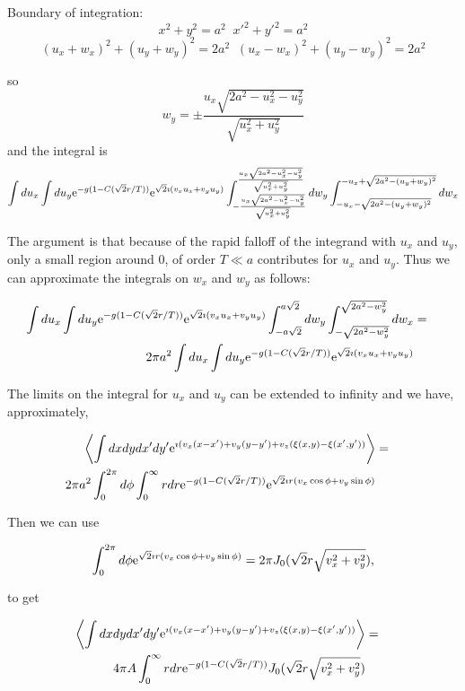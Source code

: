 \documentclass[11pt,openany]{report}
\newcommand{\e}{{\rm e}}
\begin{document}
{{Boundary of integration:
$$x^{2}+y^{2}=a^{2}\;\;x'^{2}+y'^{2}=a^{2}$$
$$(u_{x}+w_{x})^{2}+(u_{y}+w_{y})^{2}=2a^{2}\;\;(u_{x}-w_{x})^{2}+(u_{y}-w_{y})^{2}=2a^{2}$$

so
$$w_{y}=\pm\frac{u_{x}\sqrt{2a^{2}-u_{x}^{2}-u_y^{2}}}{\sqrt{u_{x}^{2}+u_{y}^{2}}}$$
and
 the integral is
$$\int du_{x} \int du_{y}\e^{-g(1-C(\sqrt{2}r/T))}\e^{\sqrt{2}\imath( v_{x}u_{x}+v_{y}u_{y})}\int_{-\frac{u_{x}\sqrt{2a^{2}-u_{x}^{2}-u_y^{2}}}{\sqrt{u_{x}^{2}+u_{y}^{2}}}}^{\frac{u_{x}\sqrt{2a^{2}-u_{x}^{2}-u_y^{2}}}{\sqrt{u_{x}^{2}+u_{y}^{2}}}} dw_{y}\int_{-u_{x}-\sqrt{2a^{2}-(u_{y}+w_{y})^{2}}}^{-u_{x}+\sqrt{2a^{2}-(u_{y}+w_{y})^{2}}}dw_{x}$$

The argument is that because of the rapid falloff of the integrand with $u_{x}$ and $u_{y}$, only a small region around 0, of order $T\ll a$ contributes for $u_{x}$ and $u_{y}$. Thus we can approximate the integrals on $w_{x}$ and $w_{y}$ as follows:

\begin{eqnarray}
\int du_{x} \int du_{y}\e^{-g(1-C(\sqrt{2}r/T))}\e^{\sqrt{2}\imath( v_{x}u_{x}+v_{y}u_{y})}\int_{-a\sqrt{2}}^{a\sqrt{2}}dw_{y}\int_{-\sqrt{2a^{2}-w_{y}^{2}}}^{\sqrt{2a^{2}-w_{y}^{2}}}dw_{x}&=&\\
2\pi a^{2}\int du_{x} \int du_{y}\e^{-g(1-C(\sqrt{2}r/T))}\e^{\sqrt{2}\imath( v_{x}u_{x}+v_{y}u_{y})}\end{eqnarray}


The limits on the integral for $u_{x}$ and $u_{y}$ can be extended to infinity and we have, approximately,

\begin{eqnarray}
\left<\int dx dydx'dy'\e^{\imath( v_{x}(x-x')+v_{y}(y-y')+v_{z}(\xi(x,y)-\xi(x',y'))}\right>&=&\\
2\pi a^{2}\int_{0}^{2\pi} d\phi\int_{0}^{\infty} r dr\e^{-g(1-C(\sqrt{2}r/T))}\e^{\sqrt{2}\imath r(v_{x}\cos\phi+v_{y}\sin\phi)}\end{eqnarray}

Then we can use

$$\int_{0}^{2\pi} d\phi\e^{\sqrt{2}\imath r(v_{x}\cos\phi+v_{y}\sin\phi)}=2\pi J_{0}(\sqrt{2}r\sqrt{v_{x}^{2}+v_{y}^{2}}),$$

to get

\begin{eqnarray}
\left<\int dx dydx'dy'\e^{\imath( v_{x}(x-x')+v_{y}(y-y')+v_{z}(\xi(x,y)-\xi(x',y'))}\right>&=&\\
4\pi A\int_{0}^{\infty} r dr\e^{-g(1-C(\sqrt{2}r/T))} J_{0}(\sqrt{2}r\sqrt{v_{x}^{2}+v_{y}^{2}})\end{eqnarray}

}}
\end{document}
